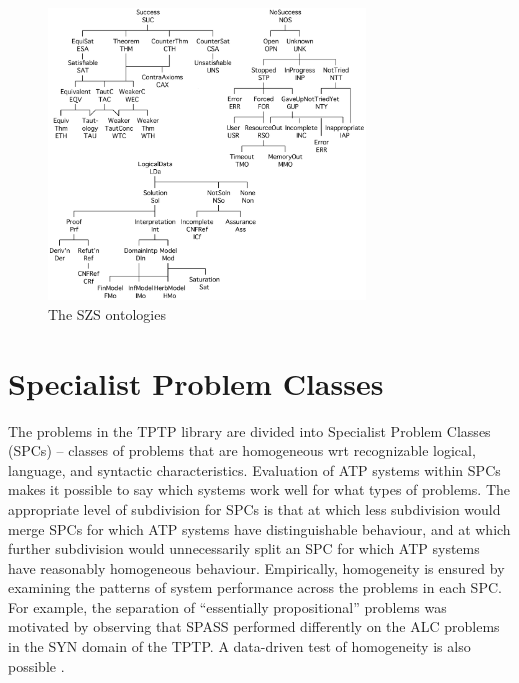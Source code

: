 \documentclass{easychair}
\begin{document}
\begin{figure}[bht]
\begin{center}
\mbox{} 
\includegraphics[width=0.75\textwidth]{SZSOntologies.pdf}
\caption{The SZS ontologies}
\label{SZS}
\end{center}
\end{figure} 

\section{Specialist Problem Classes}
\label{SPCs}

The problems in the TPTP library are divided into Specialist Problem Classes (SPCs) -- classes of 
problems that are homogeneous wrt recognizable logical, language, and syntactic characteristics.
Evaluation of ATP systems within SPCs makes it possible to say which systems work well for what 
types of problems. 
The appropriate level of subdivision for SPCs is that at which less subdivision would merge 
SPCs for which ATP systems have distinguishable behaviour, and at which further subdivision
would unnecessarily split an SPC for which ATP systems have reasonably homogeneous behaviour.
Empirically, homogeneity is ensured by examining the patterns of system performance across the 
problems in each SPC. 
For example, the separation of ``essentially propositional'' problems was motivated by observing 
that SPASS \cite{WA+99} performed differently on the ALC problems in the SYN domain of the TPTP.
A data-driven test of homogeneity is also possible \cite{FS02}.
\end{document}
